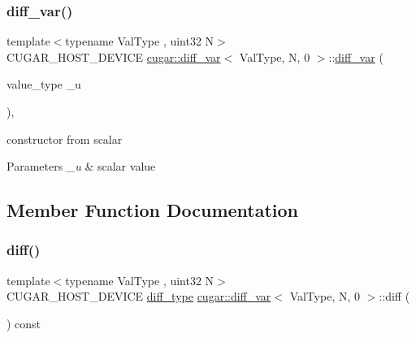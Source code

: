 \subsubsection{\texorpdfstring{diff\+\_\+var()}{diff\_var()}\hspace{0.1cm}{\footnotesize\ttfamily [3/3]}}
{\footnotesize\ttfamily template$<$typename Val\+Type , uint32 N$>$ \\
C\+U\+G\+A\+R\+\_\+\+H\+O\+S\+T\+\_\+\+D\+E\+V\+I\+CE \hyperlink{structcugar_1_1diff__var}{cugar\+::diff\+\_\+var}$<$ Val\+Type, N, 0 $>$\+::\hyperlink{structcugar_1_1diff__var}{diff\+\_\+var} (\begin{DoxyParamCaption}\item[{value\+\_\+type}]{\+\_\+u }\end{DoxyParamCaption})\hspace{0.3cm}{\ttfamily [inline]}, {\ttfamily [explicit]}}

constructor from scalar


\begin{DoxyParams}{Parameters}
{\em \+\_\+u} & scalar value \\
\hline
\end{DoxyParams}


\subsection{Member Function Documentation}
\mbox{\label{structcugar_1_1diff__var_3_01_val_type_00_01_n_00_010_01_4_a84a60225546646625806f4c280c3071d}} 
\subsubsection{\texorpdfstring{diff()}{diff()}}
{\footnotesize\ttfamily template$<$typename Val\+Type , uint32 N$>$ \\
C\+U\+G\+A\+R\+\_\+\+H\+O\+S\+T\+\_\+\+D\+E\+V\+I\+CE \hyperlink{structcugar_1_1_vector}{diff\+\_\+type} \hyperlink{structcugar_1_1diff__var}{cugar\+::diff\+\_\+var}$<$ Val\+Type, N, 0 $>$\+::diff (\begin{DoxyParamCaption}{ }\end{DoxyParamCaption}) const\hspace{0.3cm}{\ttfamily [inline]}}

